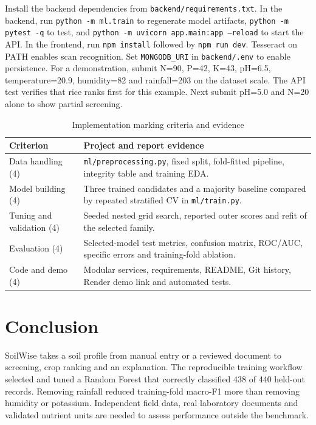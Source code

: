 \documentclass[conference]{IEEEtran}
\begin{document}
Install the backend dependencies from \texttt{backend/requirements.txt}. In the backend, run \texttt{python -m ml.train} to regenerate model artifacts, \texttt{python -m pytest -q} to test, and \texttt{python -m uvicorn app.main:app --reload} to start the API. In the frontend, run \texttt{npm install} followed by \texttt{npm run dev}. Tesseract on PATH enables scan recognition. Set \texttt{MONGODB\_URI} in \texttt{backend/.env} to enable persistence. For a demonstration, submit N=90, P=42, K=43, pH=6.5, temperature=20.9, humidity=82 and rainfall=203 on the dataset scale. The API test verifies that rice ranks first for this example. Next submit pH=5.0 and N=20 alone to show partial screening.

\begin{table}[t]
\caption{Implementation marking criteria and evidence}
\label{tab:rubric}
\centering\footnotesize
\begin{tabularx}{\columnwidth}{@{}p{}L@{}}
\toprule
Criterion & Project and report evidence \\
\midrule
Data handling (4) & \texttt{ml/preprocessing.py}, fixed split, fold-fitted pipeline, integrity table and training EDA. \\
Model building (4) & Three trained candidates and a majority baseline compared by repeated stratified CV in \texttt{ml/train.py}. \\
Tuning and validation (4) & Seeded nested grid search, reported outer scores and refit of the selected family. \\
Evaluation (4) & Selected-model test metrics, confusion matrix, ROC/AUC, specific errors and training-fold ablation. \\
Code and demo (4) & Modular services, requirements, README, Git history, Render demo link and automated tests. \\
\bottomrule
\end{tabularx}
\end{table}


\section{Conclusion}
SoilWise takes a soil profile from manual entry or a reviewed document to screening, crop ranking and an explanation. The reproducible training workflow selected and tuned a Random Forest that correctly classified 438 of 440 held-out records. Removing rainfall reduced training-fold macro-F1 more than removing humidity or potassium. Independent field data, real laboratory documents and validated nutrient units are needed to assess performance outside the benchmark.
\end{document}
